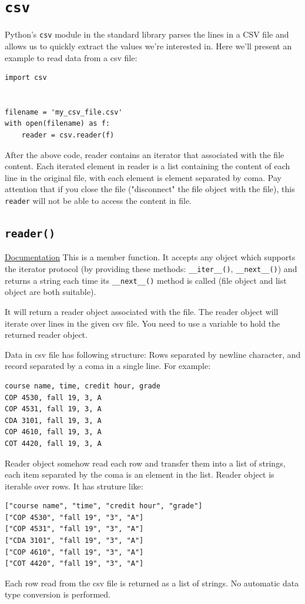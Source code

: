 \documentclass[12pt]{book}
\begin{document}
\chapter{\texttt{csv}}
\label{sec:orgfcbec18}
Python's \texttt{csv} module in the standard library parses the lines in a CSV file and allows us to quickly extract the values we're interested in. Here we'll present an example to read data from a csv file:
\begin{verbatim}
import csv


filename = 'my_csv_file.csv'
with open(filename) as f:
    reader = csv.reader(f)
\end{verbatim}
After the above code, reader contains an iterator that associated with the file content. Each iterated element in reader is a list containing the content of each line in the original file, with each element is element separated by coma. Pay attention that if you close the file ("disconnect" the file object with the file), this \texttt{reader} will not be able to access the content in file.

\section{\texttt{reader()}}
\label{sec:org18ee782}
\href{https://docs.python.org/3/library/csv.html\#csv.reader}{Documentation}
This is a member function. It accepts any object which supports the iterator protocol (by providing these methods: \texttt{\_\_iter\_\_()}, \texttt{\_\_next\_\_()}) and returns a string each time its \texttt{\_\_next\_\_()} method is called (file object and list object are both suitable).

It will return a reader object associated with the file. The reader object will iterate over lines in the given csv file. You need to use a variable to hold the returned reader object.

Data in csv file has following structure: Rows separated by newline character, and record separated by a coma in a single line. For example:
\begin{verbatim}
course name, time, credit hour, grade
COP 4530, fall 19, 3, A
COP 4531, fall 19, 3, A
CDA 3101, fall 19, 3, A
COP 4610, fall 19, 3, A
COT 4420, fall 19, 3, A
\end{verbatim}

Reader object somehow read each row and transfer them into a list of strings, each item separated by the coma is an element in the list. Reader object is iterable over rows. It has struture like:
\begin{verbatim}
["course name", "time", "credit hour", "grade"]
["COP 4530", "fall 19", "3", "A"]
["COP 4531", "fall 19", "3", "A"]
["CDA 3101", "fall 19", "3", "A"]
["COP 4610", "fall 19", "3", "A"]
["COT 4420", "fall 19", "3", "A"]
\end{verbatim}
Each row read from the csv file is returned as a list of strings. No automatic data type conversion is performed.
\end{document}
